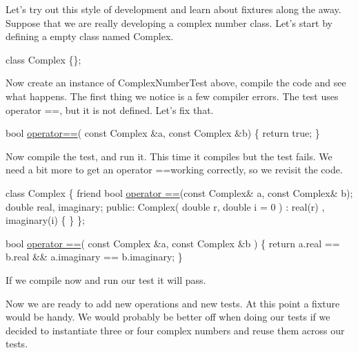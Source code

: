 Let's try out this style of development and learn about fixtures along the away. Suppose that we are really developing a complex number class. Let's start by defining a empty class named Complex.


\begin{DoxyCode}
\textcolor{keyword}{class }Complex \{\};
\end{DoxyCode}


Now create an instance of Complex\+Number\+Test above, compile the code and see what happens. The first thing we notice is a few compiler errors. The test uses {\ttfamily operator ==}, but it is not defined. Let's fix that.


\begin{DoxyCode}
\textcolor{keywordtype}{bool} \hyperlink{group___a_p_i___o_g_l_e_s2_ga8425a5ca2f4117542f2cb1c12ded2236}{operator==}( \textcolor{keyword}{const} Complex &a, \textcolor{keyword}{const} Complex &b) 
\{ 
  \textcolor{keywordflow}{return} \textcolor{keyword}{true}; 
\}
\end{DoxyCode}


Now compile the test, and run it. This time it compiles but the test fails. We need a bit more to get an {\ttfamily operator ==}working correctly, so we revisit the code.


\begin{DoxyCode}
\textcolor{keyword}{class }Complex \{ 
  \textcolor{keyword}{friend} \textcolor{keywordtype}{bool} \hyperlink{group___a_p_i___o_g_l_e_s2_ga8425a5ca2f4117542f2cb1c12ded2236}{operator ==}(\textcolor{keyword}{const} Complex& a, \textcolor{keyword}{const} Complex& b);
  \textcolor{keywordtype}{double} real, imaginary;
\textcolor{keyword}{public}:
  Complex( \textcolor{keywordtype}{double} r, \textcolor{keywordtype}{double} i = 0 ) 
    : real(r)
    , imaginary(i) 
  \{
  \}
\};

\textcolor{keywordtype}{bool} \hyperlink{group___a_p_i___o_g_l_e_s2_ga8425a5ca2f4117542f2cb1c12ded2236}{operator ==}( \textcolor{keyword}{const} Complex &a, \textcolor{keyword}{const} Complex &b )
\{ 
  \textcolor{keywordflow}{return} a.real == b.real  &&  a.imaginary == b.imaginary; 
\}
\end{DoxyCode}


If we compile now and run our test it will pass.

Now we are ready to add new operations and new tests. At this point a fixture would be handy. We would probably be better off when doing our tests if we decided to instantiate three or four complex numbers and reuse them across our tests.

